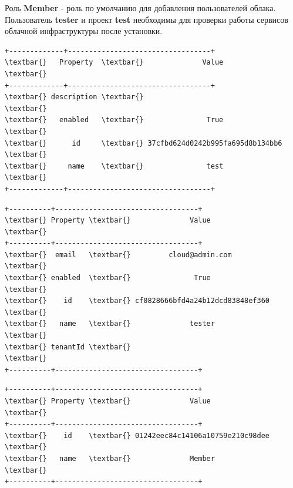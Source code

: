 \documentclass[letterpaper,10pt,russian]{sphinxmanual}
\begin{document}

Роль \textbf{Member} - роль по умолчанию для добавления пользователей облака. Пользователь \textbf{tester} и проект \textbf{test} необходимы для проверки работы сервисов облачной инфраструктуры после установки.


\begin{Verbatim}[commandchars=\\\{\}]
+-------------+----------------------------------+
\textbar{}   Property  \textbar{}              Value               \textbar{}
+-------------+----------------------------------+
\textbar{} description \textbar{}                                  \textbar{}
\textbar{}   enabled   \textbar{}               True               \textbar{}
\textbar{}      id     \textbar{} 37cfbd624d0242b995fa695d8b134bb6 \textbar{}
\textbar{}     name    \textbar{}               test               \textbar{}
+-------------+----------------------------------+
\end{Verbatim}


\begin{Verbatim}[commandchars=\\\{\}]
+----------+----------------------------------+
\textbar{} Property \textbar{}              Value               \textbar{}
+----------+----------------------------------+
\textbar{}  email   \textbar{}         cloud@admin.com          \textbar{}
\textbar{} enabled  \textbar{}               True               \textbar{}
\textbar{}    id    \textbar{} cf0828666bfd4a24b12dcd83848ef360 \textbar{}
\textbar{}   name   \textbar{}              tester              \textbar{}
\textbar{} tenantId \textbar{}                                  \textbar{}
+----------+----------------------------------+
\end{Verbatim}


\begin{Verbatim}[commandchars=\\\{\}]
+----------+----------------------------------+
\textbar{} Property \textbar{}              Value               \textbar{}
+----------+----------------------------------+
\textbar{}    id    \textbar{} 01242eec84c14106a10759e210c98dee \textbar{}
\textbar{}   name   \textbar{}              Member              \textbar{}
+----------+----------------------------------+
\end{Verbatim}
\end{document}
